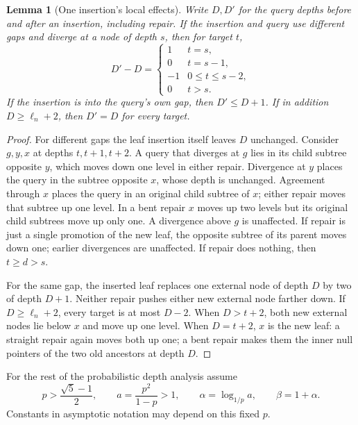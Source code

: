 \documentclass[11pt]{article}
\newtheorem{lemma}[theorem]{Lemma}
\begin{document}
\begin{lemma}[One insertion's local effects]\label{lem:effects}
Write $D,D'$ for the query depths before and after an insertion, including
repair. If the insertion and query use different gaps and diverge at a node
of depth $s$, then for target $t$,
\begin{equation}
 D'-D=\begin{cases}
  1 & t=s,\\
  0 & t=s-1,\\
 -1 & 0\le t\le s-2,\\
  0 & t>s.
 \end{cases}                                                   \label{eq:effects}
\end{equation}
If the insertion is into the query's own gap, then $D'\le D+1$.
If in addition $D\ge\ell_n+2$, then $D'=D$ for every target.
\end{lemma}
\begin{proof}
For different gaps the leaf insertion itself leaves $D$ unchanged. Consider
$g,y,x$ at depths $t,t+1,t+2$. A query that diverges at $g$ lies in its child
subtree opposite $y$, which moves down one level in either repair. Divergence
at $y$ places the query in the subtree opposite $x$, whose depth is unchanged.
Agreement through $x$ places the query in an original child subtree of $x$;
either repair moves that subtree up one level. In a bent repair $x$ moves up
two levels but its original child subtrees move up only one. A divergence
above $g$ is unaffected. If repair is just a single promotion of the new leaf,
the opposite subtree of its parent moves down one; earlier divergences are
unaffected. If repair does nothing, then $t\ge d>s$.

For the same gap, the inserted leaf replaces one external node of depth $D$
by two of depth $D+1$. Neither repair pushes either new external node farther
down. If $D\ge\ell_n+2$, every target is at most $D-2$. When $D>t+2$,
both new external nodes lie below $x$ and move up one level. When $D=t+2$,
$x$ is the new leaf: a straight repair again moves both up one; a bent repair
makes them the inner null pointers of the two old ancestors at depth $D$.
\end{proof}

For the rest of the probabilistic depth analysis assume
\begin{equation}
 p>\frac{\sqrt5-1}{2},\qquad
 a=\frac{p^2}{1-p}>1,\qquad
 \alpha=\log_{1/p}a,\qquad \beta=1+\alpha.
                                                               \label{eq:constants}
\end{equation}
Constants in asymptotic notation may depend on this fixed $p$.
\end{document}
